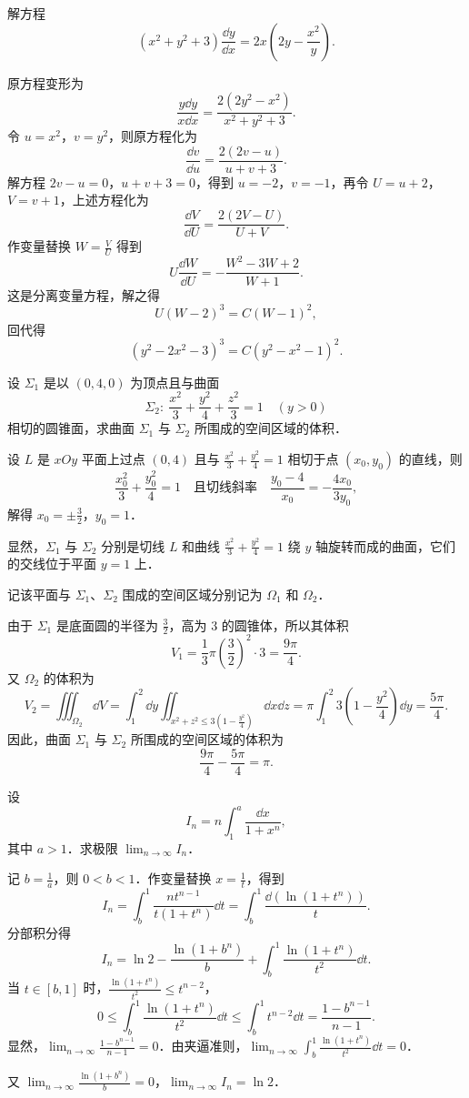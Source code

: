 解方程
\[
(x^2+y^2+3)\frac{\dd y}{\dd x}=2x\left(2y-\frac{x^2}{y}\right).
\]
\begin{solution}
原方程变形为
\[
\frac{y\dd y}{x\dd x}=\frac{2(2y^2-x^2)}{x^2+y^2+3}.
\]
令 $u=x^2$，$v=y^2$，则原方程化为
\[
\frac{\dd v}{\dd u}=\frac{2(2v-u)}{u+v+3}.
\]
解方程 $2v-u=0$，$u+v+3=0$，得到 $u=-2$，$v=-1$，再令 $U=u+2$，$V=v+1$，上述方程化为
\[
\frac{\dd V}{\dd U}=\frac{2(2V-U)}{U+V}.
\]
作变量替换 $W=\frac{V}{U}$ 得到
\[
U\frac{\dd W}{\dd U}=-\frac{W^2-3W+2}{W+1}.
\]
这是分离变量方程，解之得
\[
U(W-2)^3=C(W-1)^2,
\]
回代得
\[
(y^2-2x^2-3)^3=C(y^2-x^2-1)^2.
\]
\end{solution}

设 $\Sigma_1$ 是以 $(0,4,0)$ 为顶点且与曲面
\[
\Sigma_2:\ \frac{x^2}{3}+\frac{y^2}{4}+\frac{z^2}{3}=1\quad(y>0)
\]
相切的圆锥面，求曲面 $\Sigma_1$ 与 $\Sigma_2$ 所围成的空间区域的体积．
\begin{solution}
设 $L$ 是 $xOy$ 平面上过点 $(0,4)$ 且与 $\frac{x^2}{3}+\frac{y^2}{4}=1$ 相切于点 $(x_0,y_0)$ 的直线，则
\[
\frac{x_0^2}{3}+\frac{y_0^2}{4}=1
\quad\text{且切线斜率}\quad
\frac{y_0-4}{x_0}=-\frac{4x_0}{3y_0},
\]
解得 $x_0=\pm\frac{3}{2}$，$y_0=1$．

显然，$\Sigma_1$ 与 $\Sigma_2$ 分别是切线 $L$ 和曲线 $\frac{x^2}{3}+\frac{y^2}{4}=1$ 绕 $y$ 轴旋转而成的曲面，它们的交线位于平面 $y=1$ 上．

记该平面与 $\Sigma_1$、$\Sigma_2$ 围成的空间区域分别记为 $\Omega_1$ 和 $\Omega_2$．

由于 $\Sigma_1$ 是底面圆的半径为 $\frac{3}{2}$，高为 $3$ 的圆锥体，所以其体积
\[
V_1=\frac{1}{3}\pi\left(\frac{3}{2}\right)^2\cdot3=\frac{9\pi}{4}.
\]
又 $\Omega_2$ 的体积为
\[
V_2=\iiint_{\Omega_2}\dd V
=\int_1^2\dd y\iint_{x^2+z^2\le3\left(1-\frac{y^2}{4}\right)}\dd x\dd z
=\pi\int_1^2 3\left(1-\frac{y^2}{4}\right)\dd y
=\frac{5\pi}{4}.
\]
因此，曲面 $\Sigma_1$ 与 $\Sigma_2$ 所围成的空间区域的体积为
\[
\frac{9\pi}{4}-\frac{5\pi}{4}=\pi.
\]
\end{solution}

设
\[
I_n=n\int_1^a\frac{\dd x}{1+x^n},
\]
其中 $a>1$．求极限 $\displaystyle \lim_{n\to\infty}I_n$．
\begin{solution}
记 $b=\frac{1}{a}$，则 $0<b<1$．作变量替换 $x=\frac{1}{t}$，得到
\[
I_n=\int_b^1\frac{nt^{n-1}}{t(1+t^n)}\dd t
=\int_b^1\frac{\dd\left(\ln(1+t^n)\right)}{t}.
\]
分部积分得
\[
I_n=\ln2-\frac{\ln(1+b^n)}{b}+\int_b^1\frac{\ln(1+t^n)}{t^2}\dd t.
\]
当 $t\in[b,1]$ 时，$\displaystyle \frac{\ln(1+t^n)}{t^2}\le t^{n-2}$，
\[
0\le\int_b^1\frac{\ln(1+t^n)}{t^2}\dd t
\le\int_b^1 t^{n-2}\dd t
=\frac{1-b^{n-1}}{n-1}.
\]
显然，$\displaystyle \lim_{n\to\infty}\frac{1-b^{n-1}}{n-1}=0$．由夹逼准则，$\displaystyle \lim_{n\to\infty}\int_b^1\frac{\ln(1+t^n)}{t^2}\dd t=0$．

又 $\displaystyle \lim_{n\to\infty}\frac{\ln(1+b^n)}{b}=0$，$\displaystyle \lim_{n\to\infty}I_n=\ln2$．
\end{solution}

